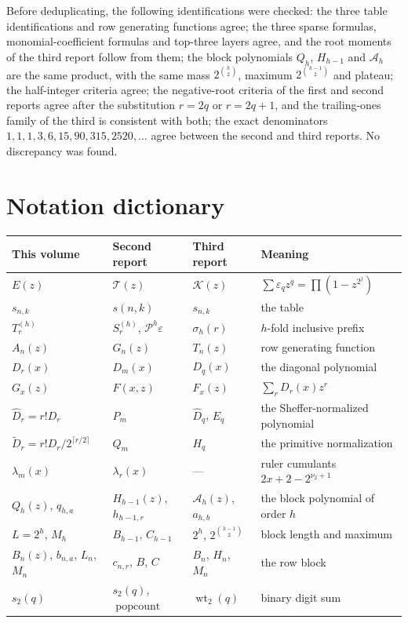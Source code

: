 \documentclass[11pt,a4paper,oneside,openany]{book}
\numberwithin{equation}{chapter}
\theoremstyle{definition}
\theoremstyle{remark}
\newcommand{\eps}{\varepsilon}
\newcommand{\Diag}{D}
\newcommand{\Dprim}{\widetilde D}
\newcommand{\Prefix}{T}
\begin{document}
Before deduplicating, the following identifications were checked: the
three table identifications and row generating functions agree; the three
sparse formulas, monomial-coefficient formulas and top-three layers agree,
and the root moments of the third report follow from them; the block
polynomials $Q_h$, $H_{h-1}$ and $\mathcal A_h$ are the same product, with
the same mass $2^{\binom h2}$, maximum $2^{\binom{h-1}2}$ and plateau; the
half-integer criteria agree; the negative-root criteria of the first and
second reports agree after the substitution $r=2q$ or $r=2q+1$, and the
trailing-ones family of the third is consistent with both; the exact
denominators $1,1,1,3,6,15,90,315,2520,\ldots$ agree between the second and
third reports. No discrepancy was found.

\section{Notation dictionary}
\begin{center}\small
\begin{tabular}{@{}llll@{}}
\toprule
This volume & Second report & Third report & Meaning\\
\midrule
$E(z)$ & $\mathcal T(z)$ & $\mathcal K(z)$ & $\sum\eps_qz^q=\prod(1-z^{2^j})$\\
$s_{n,k}$ & $s(n,k)$ & $s_{n,k}$ & the table\\
$\Prefix_r^{(h)}$ & $S^{(h)}_r$, $\mathcal P^h\eps$ & $\sigma_h(r)$ & $h$-fold inclusive prefix\\
$A_n(z)$ & $G_n(z)$ & $T_n(z)$ & row generating function\\
$\Diag_r(x)$ & $\Diag_m(x)$ & $\Diag_q(x)$ & the diagonal polynomial\\
$G_x(z)$ & $F(x,z)$ & $F_x(z)$ & $\sum_r\Diag_r(x)z^r$\\
$\widehat\Diag_r=r!\Diag_r$ & $P_m$ & $\widehat\Diag_q$, $E_q$ & the Sheffer-normalized polynomial\\
$\Dprim_r=r!\Diag_r/2^{\lceil r/2\rceil}$ & $Q_m$ & $H_q$ & the primitive normalization\\
$\lambda_m(x)$ & $\lambda_r(x)$ & --- & ruler cumulants $2x+2-2^{\nu_2+1}$\\
$Q_h(z)$, $q_{h,a}$ & $H_{h-1}(z)$, $h_{h-1,r}$ & $\mathcal A_h(z)$, $a_{h,b}$ & the block polynomial of order $h$\\
$L=2^h$, $M_h$ & $B_{h-1}$, $C_{h-1}$ & $2^h$, $2^{\binom{h-1}2}$ & block length and maximum\\
$B_n(z)$, $b_{n,a}$, $L_n$, $M_n$ & $c_{n,r}$, $B$, $C$ & $B_n$, $H_n$, $M_n$ & the row block\\
$s_2(q)$ & $s_2(q)$, $\operatorname{popcount}$ & $\operatorname{wt}_2(q)$ & binary digit sum\\
\bottomrule
\end{tabular}
\end{center}
\end{document}
